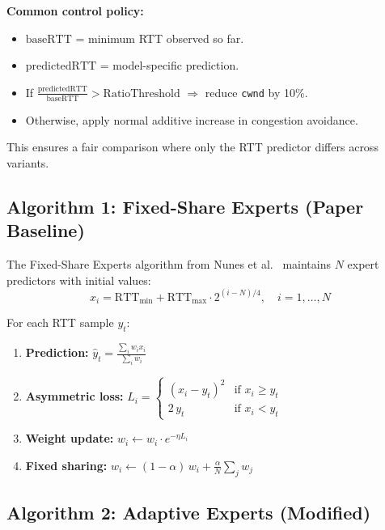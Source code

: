 \documentclass[12pt,a4paper]{article}
\begin{document}
\textbf{Common control policy:}
\begin{itemize}[nosep]
    \item $\text{baseRTT}$ = minimum RTT observed so far.
    \item $\text{predictedRTT}$ = model-specific prediction.
    \item If $\frac{\text{predictedRTT}}{\text{baseRTT}} > \text{RatioThreshold}$ $\Rightarrow$ reduce \texttt{cwnd} by 10\%.
    \item Otherwise, apply normal additive increase in congestion avoidance.
\end{itemize}

This ensures a fair comparison where only the RTT predictor differs across variants.

\subsection{Algorithm 1: Fixed-Share Experts (Paper Baseline)}
\label{sec:algo_experts}

The Fixed-Share Experts algorithm from Nunes et al.~\cite{nunes2011} maintains $N$ expert predictors with initial values:
\begin{equation}
    x_i = \text{RTT}_{\min} + \text{RTT}_{\max} \cdot 2^{(i - N)/4}, \quad i = 1, \ldots, N
\end{equation}

For each RTT sample $y_t$:
\begin{enumerate}[nosep]
    \item \textbf{Prediction:} $\hat{y}_t = \frac{\sum_i w_i x_i}{\sum_i w_i}$
    \item \textbf{Asymmetric loss:}
    $L_i = \begin{cases} (x_i - y_t)^2 & \text{if } x_i \ge y_t \\ 2\, y_t & \text{if } x_i < y_t \end{cases}$
    \item \textbf{Weight update:} $w_i \leftarrow w_i \cdot e^{-\eta L_i}$
    \item \textbf{Fixed sharing:} $w_i \leftarrow (1-\alpha)\, w_i + \frac{\alpha}{N} \sum_j w_j$
\end{enumerate}

\subsection{Algorithm 2: Adaptive Experts (Modified)}
\label{sec:algo_adaptive}
\end{document}
